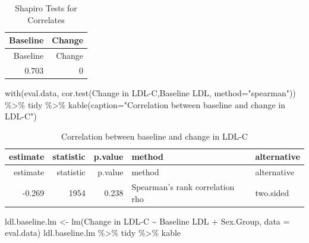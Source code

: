 \documentclass[
]{article}
\newenvironment{Shaded}{\begin{snugshade}}{\end{snugshade}}
\newcommand{\AttributeTok}[1]{\textcolor[rgb]{0.77,0.63,0.00}{#1}}
\newcommand{\FunctionTok}[1]{\textcolor[rgb]{0.00,0.00,0.00}{#1}}
\newcommand{\NormalTok}[1]{#1}
\newcommand{\OtherTok}[1]{\textcolor[rgb]{0.56,0.35,0.01}{#1}}
\newcommand{\SpecialCharTok}[1]{\textcolor[rgb]{0.00,0.00,0.00}{#1}}
\newcommand{\StringTok}[1]{\textcolor[rgb]{0.31,0.60,0.02}{#1}}
\begin{document}
\begin{longtable}[]{@{}rr@{}}
\caption{Shapiro Tests for Correlates}\tabularnewline
\toprule
Baseline & Change \\
\midrule
\endfirsthead
\toprule
Baseline & Change \\
\midrule
\endhead
0.703 & 0 \\
\bottomrule
\end{longtable}

\begin{Shaded}
\begin{Highlighting}[]
\FunctionTok{with}\NormalTok{(eval.data, }\FunctionTok{cor.test}\NormalTok{(}\StringTok{\textasciigrave{}}\AttributeTok{Change in LDL{-}C}\StringTok{\textasciigrave{}}\NormalTok{,}\StringTok{\textasciigrave{}}\AttributeTok{Baseline LDL}\StringTok{\textasciigrave{}}\NormalTok{, }\AttributeTok{method=}\StringTok{"spearman"}\NormalTok{)) }\SpecialCharTok{\%\textgreater{}\%}\NormalTok{ tidy }\SpecialCharTok{\%\textgreater{}\%} \FunctionTok{kable}\NormalTok{(}\AttributeTok{caption=}\StringTok{"Correlation between baseline and change in LDL{-}C"}\NormalTok{)}
\end{Highlighting}
\end{Shaded}

\begin{longtable}[]{@{}rrrll@{}}
\caption{Correlation between baseline and change in
LDL-C}\tabularnewline
\toprule
estimate & statistic & p.value & method & alternative \\
\midrule
\endfirsthead
\toprule
estimate & statistic & p.value & method & alternative \\
\midrule
\endhead
-0.269 & 1954 & 0.238 & Spearman's rank correlation rho & two.sided \\
\bottomrule
\end{longtable}

\begin{Shaded}
\begin{Highlighting}[]
\NormalTok{ldl.baseline.lm }\OtherTok{\textless{}{-}} \FunctionTok{lm}\NormalTok{(}\StringTok{\textasciigrave{}}\AttributeTok{Change in LDL{-}C}\StringTok{\textasciigrave{}} \SpecialCharTok{\textasciitilde{}} \StringTok{\textasciigrave{}}\AttributeTok{Baseline LDL}\StringTok{\textasciigrave{}} \SpecialCharTok{+} \StringTok{\textasciigrave{}}\AttributeTok{Sex.Group}\StringTok{\textasciigrave{}}\NormalTok{, }\AttributeTok{data =}\NormalTok{ eval.data)}
\NormalTok{ldl.baseline.lm }\SpecialCharTok{\%\textgreater{}\%}\NormalTok{ tidy }\SpecialCharTok{\%\textgreater{}\%}\NormalTok{ kable}
\end{Highlighting}
\end{Shaded}
\end{document}
